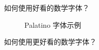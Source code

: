 \begin{myQA}{如何使用好看的数学字体？}
	\begin{figure}[h]
		\centering
		\caption{Palatino 字体示例}
		\label{Fig:pxfonts}
	\end{figure}
\end{myQA}

\begin{myQA}{如何使用更好看的数学字体？}
\end{myQA}
